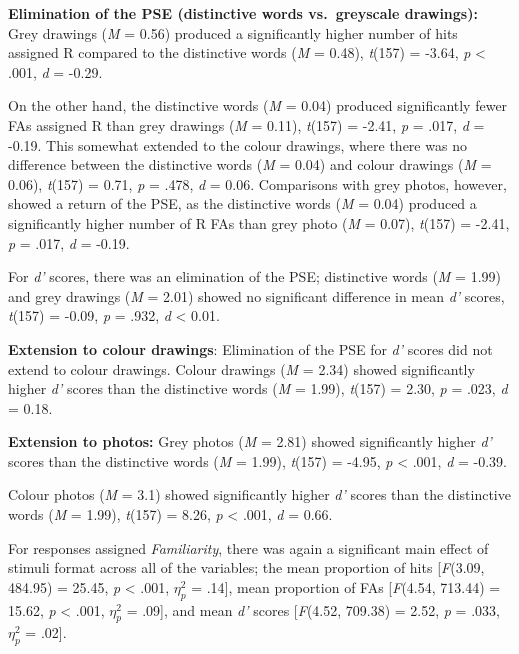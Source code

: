 \documentclass[
  11pt,
]{article}
\begin{document}
\textbf{Elimination of the PSE (distinctive words vs.~greyscale
drawings):} Grey drawings (\emph{M} = 0.56) produced a significantly
higher number of hits assigned R compared to the distinctive words
(\emph{M} = 0.48), \emph{t}(157) = -3.64, \emph{p} \textless{} .001,
\emph{d} = -0.29.

On the other hand, the distinctive words (\emph{M} = 0.04) produced
significantly fewer FAs assigned R than grey drawings (\emph{M} = 0.11),
\emph{t}(157) = -2.41, \emph{p} = .017, \emph{d} = -0.19. This somewhat
extended to the colour drawings, where there was no difference between
the distinctive words (\emph{M} = 0.04) and colour drawings (\emph{M} =
0.06), \emph{t}(157) = 0.71, \emph{p} = .478, \emph{d} = 0.06.
Comparisons with grey photos, however, showed a return of the PSE, as
the distinctive words (\emph{M} = 0.04) produced a significantly higher
number of R FAs than grey photo (\emph{M} = 0.07), \emph{t}(157) =
-2.41, \emph{p} = .017, \emph{d} = -0.19.

For \emph{d'} scores, there was an elimination of the PSE; distinctive
words (\emph{M} = 1.99) and grey drawings (\emph{M} = 2.01) showed no
significant difference in mean \emph{d'} scores, \emph{t}(157) = -0.09,
\emph{p} = .932, \emph{d} \textless{} 0.01.

\textbf{Extension to colour drawings}: Elimination of the PSE for
\emph{d'} scores did not extend to colour drawings. Colour drawings
(\emph{M} = 2.34) showed significantly higher \emph{d'} scores than the
distinctive words (\emph{M} = 1.99), \emph{t}(157) = 2.30, \emph{p} =
.023, \emph{d} = 0.18.

\textbf{Extension to photos:} Grey photos (\emph{M} = 2.81) showed
significantly higher \emph{d'} scores than the distinctive words
(\emph{M} = 1.99), \emph{t}(157) = -4.95, \emph{p} \textless{} .001,
\emph{d} = -0.39.

Colour photos (\emph{M} = 3.1) showed significantly higher \emph{d'}
scores than the distinctive words (\emph{M} = 1.99), \emph{t}(157) =
8.26, \emph{p} \textless{} .001, \emph{d} = 0.66.

\newpage

For responses assigned \emph{Familiarity}, there was again a significant
main effect of stimuli format across all of the variables; the mean
proportion of hits {[}\emph{F}(3.09, 484.95) = 25.45, \emph{p}
\textless{} .001, \(\eta^2_p\) = .14{]}, mean proportion of FAs
{[}\emph{F}(4.54, 713.44) = 15.62, \emph{p} \textless{} .001,
\(\eta^2_p\) = .09{]}, and mean \emph{d'} scores {[}\emph{F}(4.52,
709.38) = 2.52, \emph{p} = .033, \(\eta^2_p\) = .02{]}.
\end{document}
